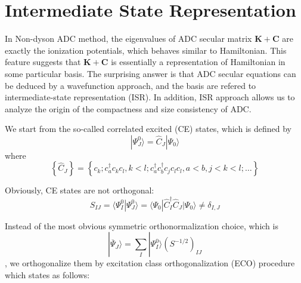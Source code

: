 \section{Intermediate State Representation}

In Non-dyson ADC method, the eigenvalues of ADC secular matrix $\boldsymbol{K}+\boldsymbol{C}$ are exactly the ionization potentials, which behaves similar to Hamiltonian.
This feature suggests that $\boldsymbol{K}+\boldsymbol{C}$ is essentially a representation of Hamiltonian in some particular basis.
The surprising answer is that ADC secular equations can be deduced by a wavefunction approach, and the basis are refered to intermediate-state representation (ISR).
In addition, ISR approach allows us to analyze the origin of the compactness and size consistency of ADC.

We start from the so-called correlated excited (CE) states, which is defined by
\begin{equation}
	| \Psi_{J}^{0} \rangle=\hat{C}_{J} | \Psi_{0} \rangle
\end{equation}
where
\begin{equation}
	\left\{\hat{C}_{J}\right\}=\left\{c_{k} ; c_{a}^{\dagger} c_{k} c_{l}, k<l ; c_{a}^{\dagger} c_{b}^{\dagger} c_{j} c_{l} c_{l}, a<b, j<k<l ; \ldots\right\}
\end{equation}

Obviously, CE states are not orthogonal:
\begin{equation}
	S_{I J}=\langle\Psi_{I}^{0} | \Psi_{J}^{0}\rangle=\langle\Psi_{0}|\hat{C}_{I}^{\dagger} \hat{C}_{J}| \Psi_{0}\rangle \neq \delta_{I, J}
\end{equation}

Instead of the most obvious symmetric orthonormalization choice, which is 
\begin{equation}
	| \overline{\Psi}_{J} \rangle=\sum_{I} | \Psi_{I}^{0} \rangle\left(S^{-1 / 2}\right)_{I J}
\end{equation}
, we orthogonalize them by excitation class orthogonalization (ECO) procedure which states as follows:


